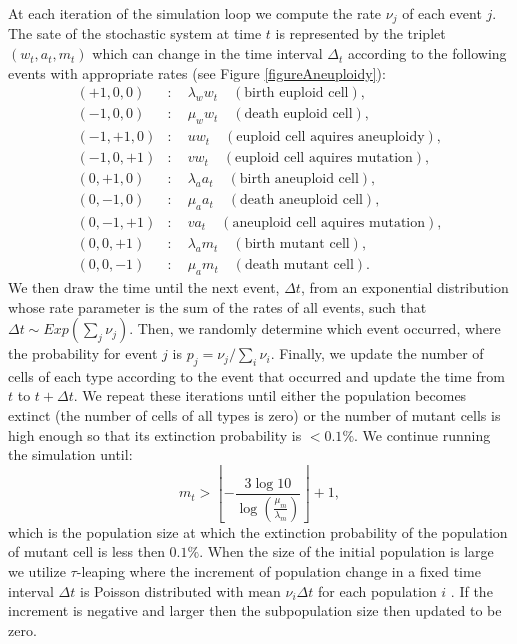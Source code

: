 \documentclass[12pt]{extarticle}
\begin{document}
At each iteration of the simulation loop we compute the rate $\nu_j$ of each event $j$. %
The sate of the stochastic system at time $t$ is represented by the triplet $\left(w_t,a_t,m_t\right)$ which can change in the time interval $\Delta_t$ according to the following events with appropriate rates (see Figure \ref{figureAneuploidy}):
\begin{subequations}
\begin{flalign*}
(+1,0,0)&:\quad \lambda_ww_t\quad\left(\text{birth euploid cell}\right),\\
(-1,0,0)&:\quad \mu_ww_t\quad\left(\text{death euploid cell}\right),\\
(-1,+1,0)&:\quad uw_t\quad\left(\text{euploid cell aquires aneuploidy}\right),\\
(-1,0,+1)&:\quad vw_t\quad\left(\text{euploid cell aquires mutation}\right),\\
(0,+1,0)&:\quad \lambda_aa_t\quad\left(\text{birth aneuploid cell}\right),\\
(0,-1,0)&:\quad \mu_aa_t\quad\left(\text{death aneuploid cell}\right),\\
(0,-1,+1)&:\quad va_t\quad\left(\text{aneuploid cell aquires mutation}\right),\\
(0,0,+1)&:\quad \lambda_am_t\quad\left(\text{birth mutant cell}\right),\\
(0,0,-1)&:\quad \mu_am_t\quad\left(\text{death mutant cell}\right).
\end{flalign*}
\end{subequations}
We then draw the time until the next event, $\Delta t$, from an exponential distribution whose rate parameter is the sum of the rates of all events, such that $\Delta t \sim \textit{Exp}(\sum_j \nu_j)$.
Then, we randomly determine which event occurred, where the probability for event $j$ is $p_j=\nu_j/\sum_i \nu_i$.
Finally, we update the number of cells of each type according to the event that occurred and update the time from $t$ to $t+\Delta t$. %
We repeat these iterations until either the population becomes extinct (the number of cells of all types is zero) or the number of mutant cells is high enough so that its extinction probability is $<0.1\%$. %
We continue running the simulation until:
\begin{equation*}
m_t>\left\lfloor-\frac{3\log10}{\log\left(\frac{\mu_m}{\lambda_m}\right)}\right\rfloor+1,
\end{equation*}
which is the population size at which the extinction probability of the population of mutant cell is less then $0.1\%$. 
When the size of the initial population is large we utilize $\tau$-leaping where the increment of population change in a fixed time interval $\Delta t$ is Poisson distributed with mean $\nu_i\Delta t$ for each population $i$ \cite{gillespie2001approximate}. If the increment is negative and larger then the subpopulation size then updated to be zero.
\end{document}
